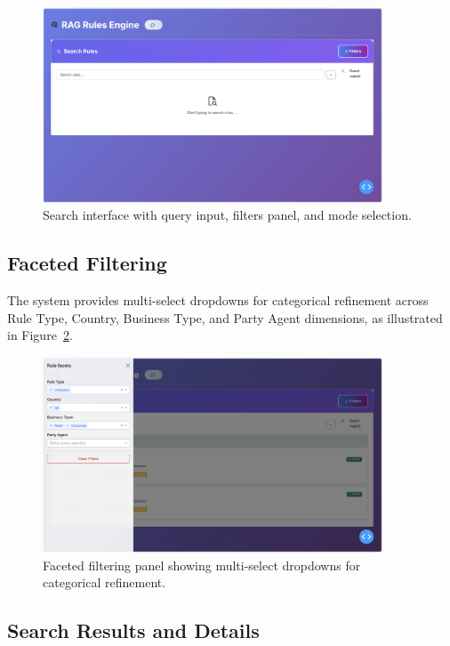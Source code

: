 \begin{figure}[!htbp]
\centering
\includegraphics[width=0.9\textwidth]{Figures/full_search.png}
\caption{Search interface with query input, filters panel, and mode selection.}
\label{fig:search-interface}
\end{figure}

\subsection{Faceted Filtering}

The system provides multi-select dropdowns for categorical refinement across Rule Type, Country, Business Type, and Party Agent dimensions, as illustrated in Figure~\ref{fig:search-filters}.

\begin{figure}[!htbp]
\centering
\includegraphics[width=0.9\textwidth]{Figures/search_filters.png}
\caption{Faceted filtering panel showing multi-select dropdowns for categorical refinement.}
\label{fig:search-filters}
\end{figure}

\subsection{Search Results and Details}

